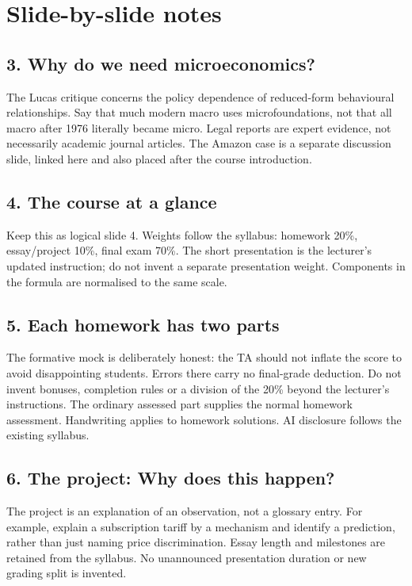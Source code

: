 \documentclass[11pt,a4paper]{article}
\begin{document}
\section*{Slide-by-slide notes}

\subsection*{3. Why do we need microeconomics?}
The Lucas critique concerns the policy dependence of reduced-form behavioural relationships. Say that much modern macro uses microfoundations, not that all macro after 1976 literally became micro. Legal reports are expert evidence, not necessarily academic journal articles. The Amazon case is a separate discussion slide, linked here and also placed after the course introduction.

\subsection*{4. The course at a glance}
Keep this as logical slide 4. Weights follow the syllabus: homework 20\%, essay/project 10\%, final exam 70\%. The short presentation is the lecturer's updated instruction; do not invent a separate presentation weight. Components in the formula are normalised to the same scale.

\subsection*{5. Each homework has two parts}
The formative mock is deliberately honest: the TA should not inflate the score to avoid disappointing students. Errors there carry no final-grade deduction. Do not invent bonuses, completion rules or a division of the 20\% beyond the lecturer's instructions. The ordinary assessed part supplies the normal homework assessment. Handwriting applies to homework solutions. AI disclosure follows the existing syllabus.

\subsection*{6. The project: Why does this happen?}
The project is an explanation of an observation, not a glossary entry. For example, explain a subscription tariff by a mechanism and identify a prediction, rather than just naming price discrimination. Essay length and milestones are retained from the syllabus. No unannounced presentation duration or new grading split is invented.
\end{document}
